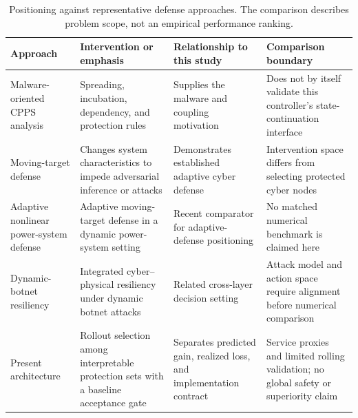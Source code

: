 \begin{table}[!htbp]
\centering\small
\caption{Positioning against representative defense approaches. The comparison describes problem scope, not an empirical performance ranking.}
\label{tab:related_comparison}
\begin{tabularx}{\textwidth}{p{}XXX}
\toprule
Approach & Intervention or emphasis & Relationship to this study & Comparison boundary\\
\midrule
Malware-oriented CPPS analysis \cite{xu2020analysis,xu2023resilience,zhang2025robustness} & Spreading, incubation, dependency, and protection rules & Supplies the malware and coupling motivation & Does not by itself validate this controller's state-continuation interface\\
Moving-target defense \cite{cho2020proactive,griffioen2021moving} & Changes system characteristics to impede adversarial inference or attacks & Demonstrates established adaptive cyber defense & Intervention space differs from selecting protected cyber nodes\\
Adaptive nonlinear power-system defense \cite{mohammadpourfard2025adaptive} & Adaptive moving-target defense in a dynamic power-system setting & Recent comparator for adaptive-defense positioning & No matched numerical benchmark is claimed here\\
Dynamic-botnet resiliency \cite{zhao2024iotbotnet} & Integrated cyber--physical resiliency under dynamic botnet attacks & Related cross-layer decision setting & Attack model and action space require alignment before numerical comparison\\
Present architecture & Rollout selection among interpretable protection sets with a baseline acceptance gate & Separates predicted gain, realized loss, and implementation contract & Service proxies and limited rolling validation; no global safety or superiority claim\\
\bottomrule
\end{tabularx}
\end{table}
